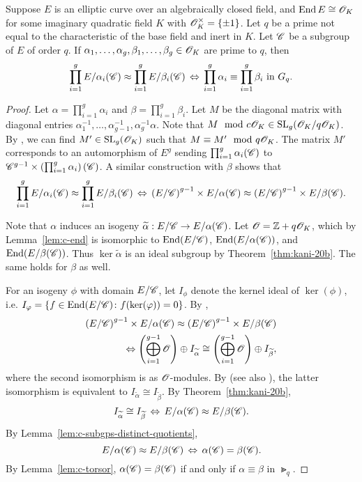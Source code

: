 \documentclass{amsart}
\begin{document}
\begin{lemma}\label{lem:prod-equiv-torsor}
  Suppose $E$ is an elliptic curve over an algebraically closed field, and $\operatorname{End} E \cong \mathscr{O}_K$ for some imaginary quadratic field $K$ with $\mathscr{O}_K^\times = \{\pm 1\}$. Let $q$ be a prime not equal to the characteristic of the base field and inert in $K$. Let $\mathscr{C}$ be a subgroup of $E$ of order $q$. If $\alpha_1,\dots,\alpha_g,\beta_1,\dots,\beta_g \in \mathscr{O}_K$ are prime to $q$, then
  \[
    \prod_{i=1}^g E/\alpha_i(\mathscr{C}) \approx \prod_{i=1}^g E/\beta_i(\mathscr{C})
    \,\Leftrightarrow\,
    \prod_{i=1}^g \alpha_i \equiv \prod_{i=1}^g \beta_i \text{ in } G_q.
  \]
\end{lemma}
\begin{proof}
  Let $\alpha = \prod_{i=1}^g\alpha_i$ and $\beta = \prod_{i=1}^g\beta_i$. Let $M$ be the diagonal matrix with diagonal entries $\alpha_1^{-1},\dots,\alpha_{g-1}^{-1}, \alpha_g^{-1}\alpha$. Note that $M\mod{c\mathscr{O}_K} \in \operatorname{SL}_g(\mathscr{O}_K/q\mathscr{O}_K)$. By \cite[Cor.~5.2, Pg.~18]{ktheory1964bass}, we can find $M' \in \operatorname{SL}_g(\mathscr{O}_K)$ such that $M \equiv M' \mod{q\mathscr{O}_K}$. The matrix $M'$ corresponds to an automorphism of $E^g$ sending $\prod_{i=1}^g \alpha_i(\mathscr{C})$ to $\mathscr{C}^{g-1} \times \left(\prod_{i=1}^g \alpha_i\right)(\mathscr{C})$. A similar construction with $\beta$ shows that
  \[
    \prod_{i=1}^g E/\alpha_i(\mathscr{C}) \approx \prod_{i=1}^g E/\beta_i(\mathscr{C})
    \,\Leftrightarrow\,
    \left(E/\mathscr{C}\right)^{g-1} \times E/\alpha(\mathscr{C}) \approx \left(E/\mathscr{C}\right)^{g-1} \times E/\beta(\mathscr{C}).
  \]

  Note that $\alpha$ induces an isogeny $\widetilde{\alpha}: E/\mathscr{C} \to E/\alpha(\mathscr{C})$. Let $\mathscr{O} = \mathbb{Z} + q\mathscr{O}_K$, which by Lemma~\ref{lem:c-end} is isomorphic to $\operatorname{End}(E/\mathscr{C})$, $\operatorname{End}(E/\alpha(\mathscr{C}))$, and $\operatorname{End}(E/\beta(\mathscr{C}))$. Thus $\ker\tilde{\alpha}$ is an ideal subgroup by Theorem~\ref{thm:kani-20b}. The same holds for $\beta$ as well.

  For an isogeny $\phi$ with domain $E/\mathscr{C}$, let $I_\phi$ denote the kernel ideal of $\ker(\phi)$, i.e. $I_\varphi = \{f \in \operatorname{End}(E/\mathscr{C}) \colon f(\ker(\varphi)) = 0\}$.
  By \cite[Thm.~46]{kani2011products},
  \begin{align*}
    \left(E/\mathscr{C}\right)^{g-1} \times E/\alpha(\mathscr{C}) \approx \left(E/\mathscr{C}\right)^{g-1} \times E/\beta(\mathscr{C})
    \\
    \Leftrightarrow
    \left(\bigoplus_{i=1}^{g-1} \mathscr{O}\right) \oplus I_{\widetilde{\alpha}} \cong \left(\bigoplus_{i=1}^{g-1} \mathscr{O}\right) \oplus I_{\widetilde{\beta}},
  \end{align*}
  where the second isomorphism is as $\mathscr{O}$-modules. By \cite[Thm.~48]{kani2011products} (see also \cite[Rem.~49b]{kani2011products}), the latter isomorphism is equivalent to $I_{\tilde{\alpha}} \cong I_{\tilde{\beta}}$.
  By Theorem~\ref{thm:kani-20b},
  \[
    I_{\widetilde{\alpha}} \cong I_{\widetilde{\beta}}
    \,\Leftrightarrow\,
    E/\alpha(\mathscr{C}) \approx E/\beta(\mathscr{C}).
  \]
  By Lemma~\ref{lem:c-subgps-distinct-quotients},
  \[
    E/\alpha(\mathscr{C}) \approx E/\beta(\mathscr{C})
    \,\Leftrightarrow\,
    \alpha(\mathscr{C}) = \beta(\mathscr{C}).
  \]
  By Lemma~\ref{lem:c-torsor}, $\alpha(\mathscr{C}) = \beta(\mathscr{C})$ if and only if $\alpha \equiv \beta$ in $\Gt_q$.
\end{proof}
\end{document}

